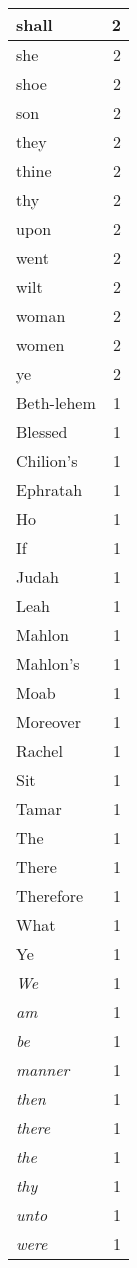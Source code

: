 \begin{center}
\begin{longtable}{l|r}
shall & 2 \\ \hline
she & 2 \\ \hline
shoe & 2 \\ \hline
son & 2 \\ \hline
they & 2 \\ \hline
thine & 2 \\ \hline
thy & 2 \\ \hline
upon & 2 \\ \hline
went & 2 \\ \hline
wilt & 2 \\ \hline
woman & 2 \\ \hline
women & 2 \\ \hline
ye & 2 \\ \hline
Beth-lehem & 1 \\ \hline
Blessed & 1 \\ \hline
Chilion's & 1 \\ \hline
Ephratah & 1 \\ \hline
Ho & 1 \\ \hline
If & 1 \\ \hline
Judah & 1 \\ \hline
Leah & 1 \\ \hline
Mahlon & 1 \\ \hline
Mahlon's & 1 \\ \hline
Moab & 1 \\ \hline
Moreover & 1 \\ \hline
Rachel & 1 \\ \hline
Sit & 1 \\ \hline
Tamar & 1 \\ \hline
The & 1 \\ \hline
There & 1 \\ \hline
Therefore & 1 \\ \hline
What & 1 \\ \hline
Ye & 1 \\ \hline
\emph{We} & 1 \\ \hline
\emph{am} & 1 \\ \hline
\emph{be} & 1 \\ \hline
\emph{manner} & 1 \\ \hline
\emph{then} & 1 \\ \hline
\emph{there} & 1 \\ \hline
\emph{the} & 1 \\ \hline
\emph{thy} & 1 \\ \hline
\emph{unto} & 1 \\ \hline
\emph{were} & 1 \\ \hline

\end{longtable}
\end{center}
